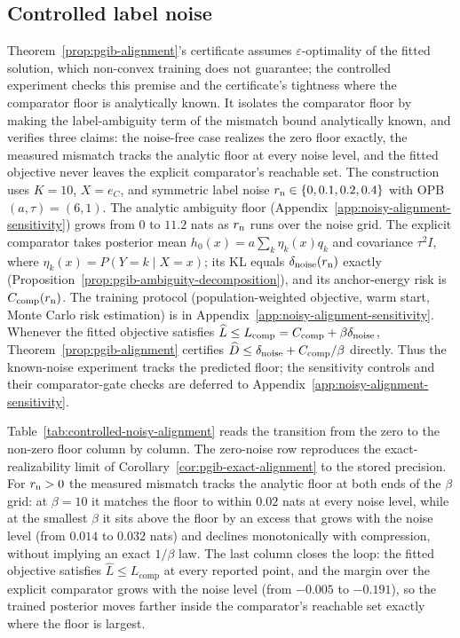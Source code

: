 \subsection{Controlled label noise}
\label{sec:controlled-validation}
Theorem~\ref{prop:pgib-alignment}'s certificate assumes $\varepsilon$-optimality of
the fitted solution, which non-convex training does not guarantee; the controlled
experiment checks this premise and the certificate's tightness where the comparator
floor is analytically known. It isolates the comparator floor by making the
label-ambiguity term of the mismatch bound analytically known, and verifies three
claims: the noise-free case realizes the zero floor exactly, the measured mismatch
tracks the analytic floor at every noise level, and the fitted objective never
leaves the explicit comparator's reachable set. The construction uses $K=10$,
$X=e_C$, and symmetric
label noise $r_{\rm n}\in\{0,0.1,0.2,0.4\}$ with OPB $(a,\tau)=(6,1)$. The analytic
ambiguity floor (Appendix~\ref{app:noisy-alignment-sensitivity}) grows from $0$ to
$11.2$ nats as $r_{\rm n}$ runs over the noise grid. The explicit comparator takes
posterior mean $h_0(x)=a\sum_k\eta_k(x)q_k$ and covariance $\tau^2I$, where
$\eta_k(x)=P(Y=k\mid X=x)$; its KL equals $\delta_{\rm noise}(r_{\rm n})$ exactly (Proposition~\ref{prop:pgib-ambiguity-decomposition}), and its
anchor-energy risk is $C_{\rm comp}(r_{\rm n})$. The training protocol (population-weighted
objective, warm start, Monte Carlo risk estimation) is in
Appendix~\ref{app:noisy-alignment-sensitivity}. Whenever the
fitted objective satisfies $\widehat L\le L_{\rm comp}=C_{\rm comp}+\beta\delta_{\rm noise}$,
Theorem~\ref{prop:pgib-alignment} certifies
$\widehat D\le\delta_{\rm noise}+C_{\rm comp}/\beta$ directly. Thus the known-noise
experiment tracks the predicted floor; the sensitivity controls and their
comparator-gate checks are deferred to
Appendix~\ref{app:noisy-alignment-sensitivity}.



Table~\ref{tab:controlled-noisy-alignment} reads the transition from the zero to the
non-zero floor column by column. The zero-noise row reproduces the exact-realizability
limit of Corollary~\ref{cor:pgib-exact-alignment} to the stored precision. For $r_{\rm n}>0$ the measured mismatch tracks the analytic
floor at both ends of the $\beta$ grid: at $\beta=10$ it matches the floor to within
$0.02$ nats at every noise level, while at the smallest $\beta$ it sits above the
floor by an excess that grows with the noise level (from $0.014$ to $0.032$ nats) and
declines monotonically with compression, without implying an exact $1/\beta$ law. The
last column closes the loop: the fitted objective satisfies
$\widehat L\le L_{\mathrm{comp}}$ at every reported point, and the margin over the
explicit comparator grows with the noise level (from $-0.005$ to $-0.191$), so the
trained posterior moves farther inside the comparator's reachable set exactly where
the floor is largest.

